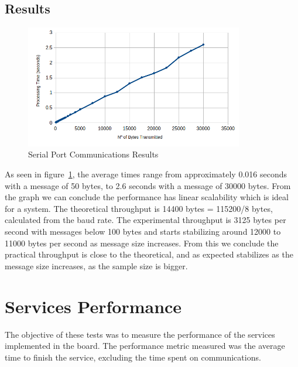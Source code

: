 \subsection{Results}\label{chap:evaluation:comms:results}

\begin{figure}[h!]
	\centering
	\includegraphics[width=0.85\textwidth]{./Images/comms-performance.png}
	\caption{Serial Port Communications Results}
	\label{fig:performance:comms}
\end{figure}

As seen in figure~\ref{fig:performance:comms}, the average times range from approximately 0.016 seconds with a message of 50 bytes, to 2.6 seconds with a message of 30000 bytes.
From the graph we can conclude the performance has linear scalability which is ideal for a system.
The theoretical throughput is 14400 bytes = 115200/8 bytes, calculated from the baud rate.
The experimental throughput is 3125 bytes per second with messages below 100 bytes and starts stabilizing around 12000 to 11000 bytes per second as message size increases.
From this we conclude the practical throughput is close to the theoretical, and as expected stabilizes as the message size increases, as the sample size is bigger.

\section{Services Performance}\label{chap:evaluation:services}

The objective of these tests was to measure the performance of the services implemented in the board.
The performance metric measured was the average time to finish the service, excluding the time spent on communications.

